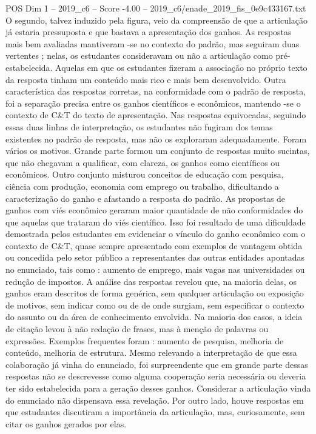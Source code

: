 \begin{textsample}{POS Dim 1 – 2019\_c6 – Score -4.00 – 2019\_c6/enade\_2019\_fis\_0e9c433167.txt}
O segundo, talvez induzido pela figura, veio da compreensão de que a articulação já estaria pressuposta e que bastava a apresentação dos ganhos.
As respostas mais bem avaliadas mantiveram -se no contexto do padrão, mas seguiram duas vertentes ; nelas, os estudantes consideravam ou não a articulação como pré-estabelecida.
Aquelas em que os estudantes fizeram a associação no próprio texto da resposta tinham um conteúdo mais rico e mais bem desenvolvido.
Outra característica das respostas corretas, na conformidade com o padrão de resposta, foi a separação precisa entre os ganhos científicos e econômicos, mantendo -se o contexto de C\&T do texto de apresentação.
Nas respostas equivocadas, seguindo essas duas linhas de interpretação, os estudantes não fugiram dos temas existentes no padrão de resposta, mas não os exploraram adequadamente.
Foram vários os motivos.
Grande parte formou um conjunto de respostas muito sucintas, que não chegavam a qualificar, com clareza, os ganhos como científicos ou econômicos.
Outro conjunto misturou conceitos de educação com pesquisa, ciência com produção, economia com emprego ou trabalho, dificultando a caracterização do ganho e afastando a resposta do padrão.
As propostas de ganhos com viés econômico geraram maior quantidade de não conformidades do que aquelas que trataram do viés científico.
Isso foi resultado de uma dificuldade demostrada pelos estudantes em evidenciar o vínculo do ganho econômico com o contexto de C\&T, quase sempre apresentado com exemplos de vantagem obtida ou concedida pelo setor público a representantes das outras entidades apontadas no enunciado, tais como : aumento de emprego, mais vagas nas universidades ou redução de impostos.
A análise das respostas revelou que, na maioria delas, os ganhos eram descritos de forma genérica, sem qualquer articulação ou exposição de motivos, sem indicar como ou de de onde surgiam, sem especificar o contexto do assunto ou da área de conhecimento envolvida.
Na maioria dos casos, a ideia de citação levou à não redação de frases, mas à menção de palavras ou expressões.
Exemplos frequentes foram : aumento de pesquisa, melhoria de conteúdo, melhoria de estrutura.
Mesmo relevando a interpretação de que essa colaboração já vinha do enunciado, foi surpreendente que em grande parte dessas respostas não se descrevesse como alguma cooperação seria necessária ou deveria ter sido estabelecida para a geração desses ganhos.
Considerar a articulação vinda do enunciado não dispensava essa revelação.
Por outro lado, houve respostas em que estudantes discutiram a importância da articulação, mas, curiosamente, sem citar os ganhos gerados por elas.

\end{textsample}

